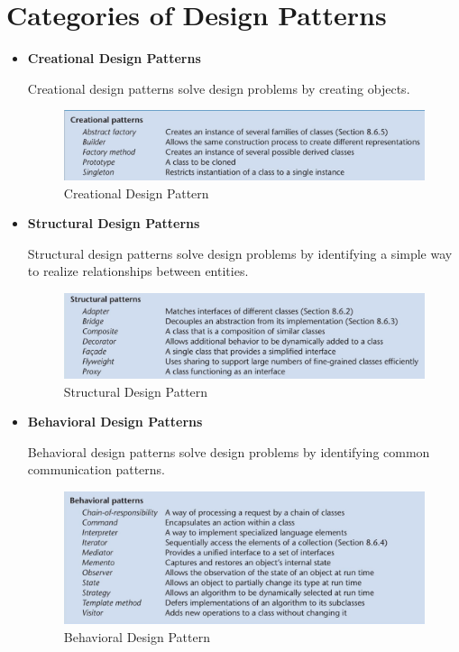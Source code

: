 \documentclass[11pt]{article}
\begin{document}
\section*{Categories of Design Patterns}
\begin{itemize}

	\item \textbf{Creational Design Patterns}
	
	Creational design patterns solve design problems by creating objects.
	\begin{figure}[h]
		\centering
		\includegraphics[width=0.84\linewidth]{images/CreationalPattern.png}
		\caption{Creational Design Pattern}
		\label{fig:CreationalPattern}
	\end{figure}
	
	\item \textbf{Structural Design Patterns}
	
	Structural design patterns solve design problems by identifying a simple way to realize relationships between entities.
	\begin{figure}[h]
		\centering
		\includegraphics[width=0.84\linewidth]{images/StructuralPattern.png}
		\caption{Structural Design Pattern}
		\label{fig:StructuralPattern}
	\end{figure}
	
	\item \textbf{Behavioral Design Patterns}
	
	Behavioral design patterns solve design problems by identifying common communication patterns.
	\begin{figure}[h]
		\centering
		\includegraphics[width=0.84\linewidth]{images/BehavioralPattern.png}
		\caption{Behavioral Design Pattern}
		\label{fig:BehavioralPattern}
	\end{figure}

	
\end{itemize}
\end{document}
